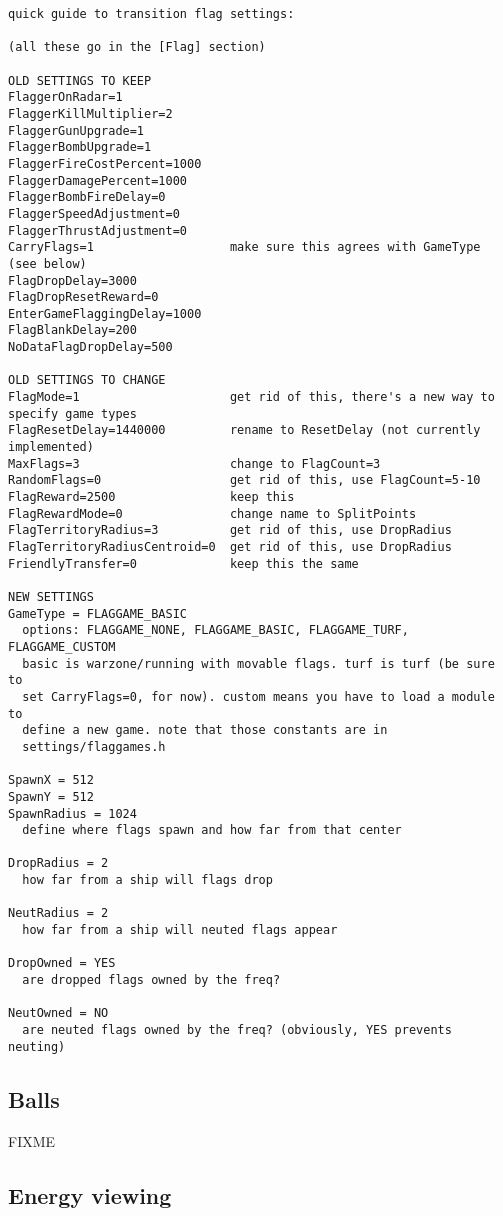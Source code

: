 \documentclass{article}
\begin{document}
\begin{verbatim}
quick guide to transition flag settings:

(all these go in the [Flag] section)

OLD SETTINGS TO KEEP
FlaggerOnRadar=1
FlaggerKillMultiplier=2
FlaggerGunUpgrade=1
FlaggerBombUpgrade=1
FlaggerFireCostPercent=1000
FlaggerDamagePercent=1000
FlaggerBombFireDelay=0
FlaggerSpeedAdjustment=0
FlaggerThrustAdjustment=0
CarryFlags=1                   make sure this agrees with GameType (see below)
FlagDropDelay=3000
FlagDropResetReward=0
EnterGameFlaggingDelay=1000
FlagBlankDelay=200
NoDataFlagDropDelay=500

OLD SETTINGS TO CHANGE
FlagMode=1                     get rid of this, there's a new way to specify game types
FlagResetDelay=1440000         rename to ResetDelay (not currently implemented)
MaxFlags=3                     change to FlagCount=3
RandomFlags=0                  get rid of this, use FlagCount=5-10
FlagReward=2500                keep this
FlagRewardMode=0               change name to SplitPoints
FlagTerritoryRadius=3          get rid of this, use DropRadius
FlagTerritoryRadiusCentroid=0  get rid of this, use DropRadius
FriendlyTransfer=0             keep this the same

NEW SETTINGS
GameType = FLAGGAME_BASIC
  options: FLAGGAME_NONE, FLAGGAME_BASIC, FLAGGAME_TURF, FLAGGAME_CUSTOM
  basic is warzone/running with movable flags. turf is turf (be sure to
  set CarryFlags=0, for now). custom means you have to load a module to
  define a new game. note that those constants are in
  settings/flaggames.h

SpawnX = 512
SpawnY = 512
SpawnRadius = 1024
  define where flags spawn and how far from that center

DropRadius = 2
  how far from a ship will flags drop

NeutRadius = 2
  how far from a ship will neuted flags appear

DropOwned = YES
  are dropped flags owned by the freq?

NeutOwned = NO
  are neuted flags owned by the freq? (obviously, YES prevents neuting)
\end{verbatim}

\subsection{Balls}

FIXME

\subsection{Energy viewing}
\end{document}

